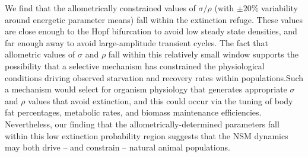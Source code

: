 \documentclass{pnastwo}
\begin{document}
\begin{article}
We find that the allometrically constrained values of $\sigma/\rho$ (with $\pm 20\%$ variability around energetic parameter means) fall within the extinction refuge. These values are close enough to the Hopf bifurcation to avoid low steady state densities, and far enough away to avoid large-amplitude transient cycles. The fact that allometric values of $\sigma$ and $\rho$ fall within this relatively small window supports the possibility that a selective mechanism has constrained the physiological conditions driving observed starvation and recovery rates within populations.Such a mechanism would select for organism physiology that generates appropriate $\sigma$ and $\rho$ values that avoid extinction, and this could occur via the tuning of body fat percentages, metabolic rates, and biomass maintenance efficiencies.
Nevertheless, our finding that the allometrically-determined parameters fall within this low extinction probability region suggests that the NSM dynamics may both drive -- and constrain -- natural animal populations.










\end{article}
\end{document}
